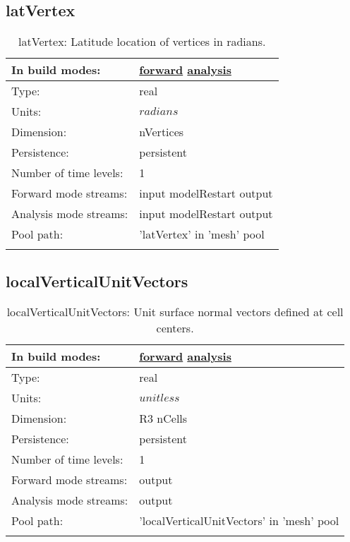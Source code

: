 \subsection[latVertex]{latVertex}
\label{subsec:var_sec_mesh_latVertex}
\begin{center}
\begin{longtable}{| p{2.0in} | p{4.0in} |}
        \hline 
        In build modes: & \hyperref[subsec:forward_var_tab_mesh]{forward} \hyperref[subsec:analysis_var_tab_mesh]{analysis} \\
        \hline 
        Type: & real \\
        \hline 
        Units: & $radians$ \\
        \hline 
        Dimension: & nVertices \\
        \hline 
        Persistence: & persistent \\
        \hline 
        Number of time levels: & 1 \\
        \hline 
		 Forward mode streams: &  input modelRestart output \\
        \hline 
		 Analysis mode streams: &  input modelRestart output \\
        \hline 
            Pool path: & 'latVertex' in 'mesh' pool
 \\
		 \hline 
    \caption{latVertex: Latitude location of vertices in radians.}
\end{longtable}
\end{center}
\subsection[localVerticalUnitVectors]{localVerticalUnitVectors}
\label{subsec:var_sec_mesh_localVerticalUnitVectors}
\begin{center}
\begin{longtable}{| p{2.0in} | p{4.0in} |}
        \hline 
        In build modes: & \hyperref[subsec:forward_var_tab_mesh]{forward} \hyperref[subsec:analysis_var_tab_mesh]{analysis} \\
        \hline 
        Type: & real \\
        \hline 
        Units: & $unitless$ \\
        \hline 
        Dimension: & R3 nCells \\
        \hline 
        Persistence: & persistent \\
        \hline 
        Number of time levels: & 1 \\
        \hline 
		 Forward mode streams: &  output \\
        \hline 
		 Analysis mode streams: &  output \\
        \hline 
            Pool path: & 'localVerticalUnitVectors' in 'mesh' pool
 \\
		 \hline 
    \caption{localVerticalUnitVectors: Unit surface normal vectors defined at cell centers.}
\end{longtable}
\end{center}
